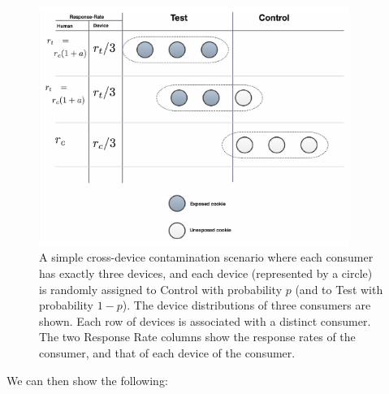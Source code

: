 \documentclass[11pt,a4paper]{article}
\theoremstyle{definition}
\theoremstyle{remark}
\theoremstyle{definition}
\theoremstyle{definition}
\theoremstyle{definition}
\theoremstyle{definition}
\theoremstyle{definition}
\theoremstyle{definition}
\begin{document}
\begin{figure}\centering
\includegraphics[width=0.9\textwidth]{contam-dilution.pdf}
\caption{\small A simple cross-device contamination scenario where each consumer has exactly three devices, and each device (represented by a circle) is randomly assigned to Control with probability $p$ (and to Test with probability $1-p$). The device distributions of three consumers are shown. Each row of devices is associated with a distinct consumer. The two Response Rate columns show the response rates of the consumer, and that of each device of the consumer.}
\label{fig-contam-dilution}
\end{figure}



We can then show the following:
\end{document}
